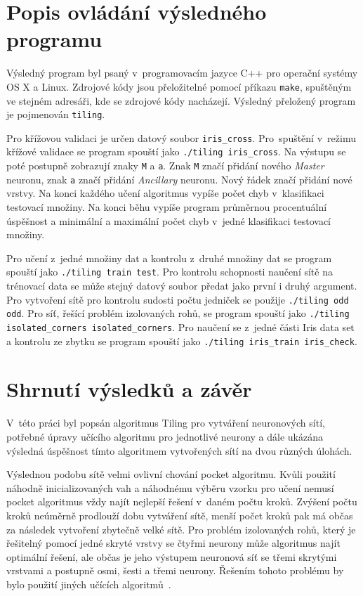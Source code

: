 \documentclass[a4paper, 11pt]{article}
\begin{document}
\section{Popis ovládání výsledného programu}
Výsledný program byl psaný v~programovacím jazyce C++ pro operační systémy OS X a Linux. Zdrojové kódy jsou přeložitelné pomocí příkazu {\tt make}, spuštěným ve stejném adresáři, kde se zdrojové kódy nacházejí. Výsledný přeložený program je pojmenován {\tt tiling}.

Pro křížovou validaci je určen datový soubor {\tt iris\_cross}. Pro~spuštění v~režimu křížové validace se program spouští jako {\tt ./tiling iris\_cross}. Na výstupu se poté postupně zobrazují znaky {\tt M} a {\tt a}. Znak {\tt M} značí přidání nového \emph{Master} neuronu, znak {\tt a} značí přidání \emph{Ancillary} neuronu. Nový řádek značí přidání nové vrstvy. Na konci každého učení algoritmus vypíše počet chyb v~klasifikaci testovací množiny. Na konci běhu vypíše program průměrnou procentuální úspěšnost a minimální a maximální počet chyb v~jedné klasifikaci testovací množiny.

Pro učení z~jedné množiny dat a kontrolu z~druhé množiny dat se program spouští jako {\tt ./tiling train test}. Pro kontrolu schopnosti naučení sítě na trénovací data se může stejný datový soubor předat jako první i druhý argument. Pro vytvoření sítě pro kontrolu sudosti počtu jedniček se použije {\tt ./tiling odd odd}. Pro síť, řešící problém izolovaných rohů, se program spouští jako {\tt ./tiling isolated\_corners isolated\_corners}. Pro naučení se z~jedné části Iris data set a kontrolu ze zbytku se program spouští jako {\tt ./tiling iris\_train iris\_check}.

\section{Shrnutí výsledků a závěr}
V~této práci byl popsán algoritmus Tiling pro vytváření neuronových sítí, potřebné úpravy učícího algoritmu pro jednotlivé neurony a dále ukázána výsledná úspěšnost tímto algoritmem vytvořených sítí na dvou různých úlohách.

Výslednou podobu sítě velmi ovlivní chování pocket algoritmu. Kvůli použití náhodně inicializovaných vah a náhodnému výběru vzorku pro učení nemusí pocket algoritmus vždy najít nejlepší řešení v~daném počtu kroků. Zvýšení počtu kroků neúměrně prodlouží dobu vytváření sítě, menší počet kroků pak má občas za následek vytvoření zbytečně velké sítě. Pro problém izolovaných rohů, který je řešitelný pomocí jedné skryté vrstvy se čtyřmi neurony může algoritmus najít optimální řešení, ale občas je jeho výstupem neuronová síť se třemi skrytými vrstvami a postupně osmi, šesti a třemi neurony. Řešením tohoto problému by bylo použití jiných učících algoritmů~\cite{twovariants}.
\end{document}
